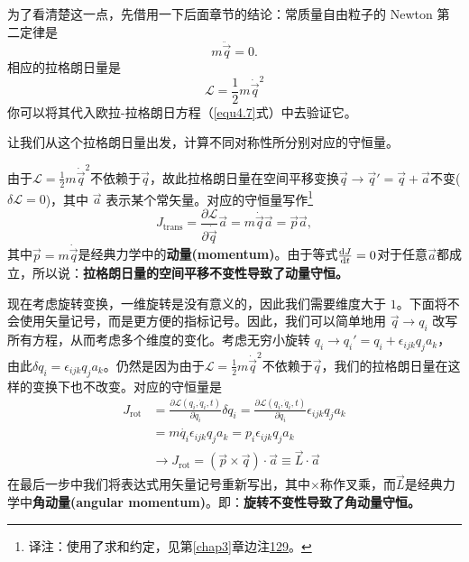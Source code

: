 为了看清楚这一点，先借用一下后面章节的结论：常质量自由粒子的 Newton 第二定律是%
\begin{equation}
\label{equ4.18}
m{\ddot{\vec{q}}} = 0 .
\end{equation}
相应的拉格朗日量是%
\begin{equation}
\label{equ4.19}
{\mathcal L}=\frac{1}{2}m\dot{\vec{q}}^2
\end{equation}
你可以将其代入欧拉-拉格朗日方程（\eqref{equ4.7}式）中去验证它。

让我们从这个拉格朗日量出发，计算不同对称性所分别对应的守恒量。

由于${\mathcal L}=\frac{1}{2}m\dot{\vec{q}}^2$不依赖于$\vec{q}$，故此拉格朗日量在空间平移变换$\vec{q}\rightarrow\vec{q}'=\vec{q}+\vec{a}$不变($\delta{\mathcal L}=0$)，其中 $\vec{a}$ 表示某个常矢量。对应的守恒量写作\footnote{译注：使用了求和约定，见第\ref{chap3}章边注\hyperref[sidenote.3.129]{129}。}
\begin{equation}
\label{equ4.20}
J_\text{trans} = \frac{\partial\mathcal L}{\partial \dot{\vec{q}}} \vec a = m {\dot{\vec{q}}} {\vec a} = \vec{p}\vec{a} ,
\end{equation}
其中$\vec{p}=m{\dot{\vec{q}}}$是经典力学中的{\bfseries 动量(momentum)}。由于等式$\frac{\mathrm d J}{\mathrm d t} = 0$对于任意$\vec a$都成立，所以说：{\bfseries 拉格朗日量的空间平移不变性导致了动量守恒。}

现在考虑旋转变换，一维旋转是没有意义的，因此我们需要维度大于 $1$。下面将不会使用矢量记号，而是更方便的指标记号。因此，我们可以简单地用 $\vec{q} \rightarrow q_i$ 改写所有方程，从而考虑多个维度的变化。考虑无穷小旋转%
%
$q_i \rightarrow q_i' = q_i + \epsilon_{ijk} q_j a_k$，由此$\delta q_i=\epsilon_{ijk}q_j a_k$。仍然是因为由于${\mathcal L}=\frac{1}{2}m{\dot\vec{q}}^2$不依赖于$\vec{q}$，我们的拉格朗日量在这样的变换下也不改变。对应的守恒量是%
\begin{equation}
\label{equ4.21}
\begin{aligned}
J_\text{rot} &= \frac{\partial {\mathcal L}(q_i, \dot q_i, t)}{\partial \dot q_i}\delta q_i  = \frac{\partial \mathcal L(q_i, \dot q_i, t)}{\partial \dot q_i} \epsilon_{ijk} q_j a_k \\
  &= m \dot{q_i} \epsilon_{ijk} q_j a_k = p_i\epsilon_{ijk} q_j a_k \\
  &\rightarrow J_\text{rot} = (\vec{p}\times\vec{q})\cdot\vec{a} \equiv \vec{L}\cdot\vec{a}
\end{aligned}
\end{equation}
在最后一步中我们将表达式用矢量记号重新写出，其中$\times$称作叉乘，而$\vec L$是经典力学中{\bfseries 角动量(angular momentum)}。即：{\bfseries 旋转不变性导致了角动量守恒。}

